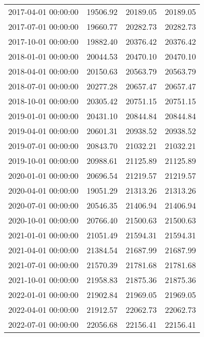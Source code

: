 \begin{table}[H]
\begin{tabular}{|c|c|c|c|}
        2017-04-01 00:00:00 & 19506.92     & 20189.05       & 20189.05        \\
        2017-07-01 00:00:00 & 19660.77     & 20282.73       & 20282.73        \\
        2017-10-01 00:00:00 & 19882.40     & 20376.42       & 20376.42        \\
        2018-01-01 00:00:00 & 20044.53     & 20470.10       & 20470.10        \\
        2018-04-01 00:00:00 & 20150.63     & 20563.79       & 20563.79        \\
        2018-07-01 00:00:00 & 20277.28     & 20657.47       & 20657.47        \\
        2018-10-01 00:00:00 & 20305.42     & 20751.15       & 20751.15        \\
        2019-01-01 00:00:00 & 20431.10     & 20844.84       & 20844.84        \\
        2019-04-01 00:00:00 & 20601.31     & 20938.52       & 20938.52        \\
        2019-07-01 00:00:00 & 20843.70     & 21032.21       & 21032.21        \\
        2019-10-01 00:00:00 & 20988.61     & 21125.89       & 21125.89        \\
        2020-01-01 00:00:00 & 20696.54     & 21219.57       & 21219.57        \\
        2020-04-01 00:00:00 & 19051.29     & 21313.26       & 21313.26        \\
        2020-07-01 00:00:00 & 20546.35     & 21406.94       & 21406.94        \\
        2020-10-01 00:00:00 & 20766.40     & 21500.63       & 21500.63        \\
        2021-01-01 00:00:00 & 21051.49     & 21594.31       & 21594.31        \\
        2021-04-01 00:00:00 & 21384.54     & 21687.99       & 21687.99        \\
        2021-07-01 00:00:00 & 21570.39     & 21781.68       & 21781.68        \\
        2021-10-01 00:00:00 & 21958.83     & 21875.36       & 21875.36        \\
        2022-01-01 00:00:00 & 21902.84     & 21969.05       & 21969.05        \\
        2022-04-01 00:00:00 & 21912.57     & 22062.73       & 22062.73        \\
        2022-07-01 00:00:00 & 22056.68     & 22156.41       & 22156.41        \\

\end{tabular}
\end{table}
